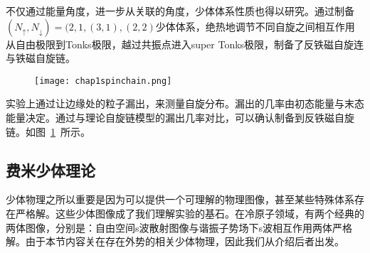 不仅通过能量角度，进一步从关联的角度，少体体系性质也得以研究。通过制备$(N_\uparrow,N_\downarrow)=(2,1,(3,1),(2,2)$少体体系，绝热地调节不同自旋之间相互作用从自由极限到Tonks极限，越过共振点进入super Tonks极限，制备了反铁磁自旋连与铁磁自旋链。
\begin{figure}[!htbp]
    \centering
    \texttt{[image: chap1spinchain.png]}
    \label{chap1spinchainexp}
\end{figure}
实验上通过让边缘处的粒子漏出，来测量自旋分布。漏出的几率由初态能量与末态能量决定。通过与理论自旋链模型的漏出几率对比，可以确认制备到反铁磁自旋链。如图~\ref{chap1spinchainexp}~所示。


\subsection{费米少体理论}
少体物理之所以重要是因为可以提供一个可理解的物理图像，甚至某些特殊体系存在严格解。这些少体图像成了我们理解实验的基石。在冷原子领域，有两个经典的两体图像，分别是：自由空间s波散射图像与谐振子势场下s波相互作用两体严格解。由于本节内容关在存在外势的相关少体物理，因此我们从介绍后者出发。


